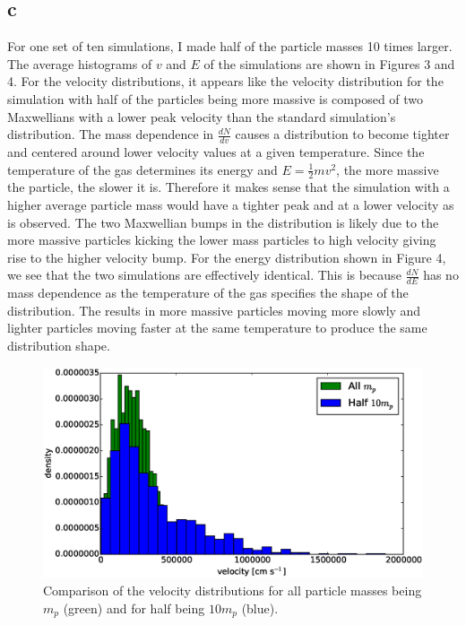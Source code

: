 \documentclass[12pt]{amsart}
\begin{document}
\subsection{c}

For one set of ten simulations, I made half of the particle masses 10 times larger.  The average histograms of $v$ and $E$ of the simulations are shown in Figures 3 and 4.  For the velocity distributions, it appears like the velocity distribution for the simulation with half of the particles being more massive is composed of two Maxwellians with a lower peak velocity than the standard simulation's distribution.  The mass dependence in $\frac{dN}{dv}$ causes a distribution to become tighter and centered around lower velocity values at a given temperature.  Since the temperature of the gas determines its energy and $E = \frac{1}{2}mv^2$, the more massive the particle, the slower it is.  Therefore it makes sense that the simulation with a higher average particle mass would have a tighter peak and at a lower velocity as is observed.  The two Maxwellian bumps in the distribution is likely due to the more massive particles kicking the lower mass particles to high velocity giving rise to the higher velocity bump.  For the energy distribution shown in Figure 4, we see that the two simulations are effectively identical.  This is because $\frac{dN}{dE}$ has no mass dependence as the temperature of the gas specifies the shape of the distribution.  The results in more massive particles moving more slowly and lighter particles moving faster at the same temperature to produce the same distribution shape.

\begin{figure}[h!]
  \centering
    \includegraphics[width=1.0\textwidth]{vel_comp.eps}
    \caption{Comparison of the velocity distributions for all particle masses being $m_p$ (green) and for half being $10m_p$ (blue).}
\end{figure}
\end{document}
